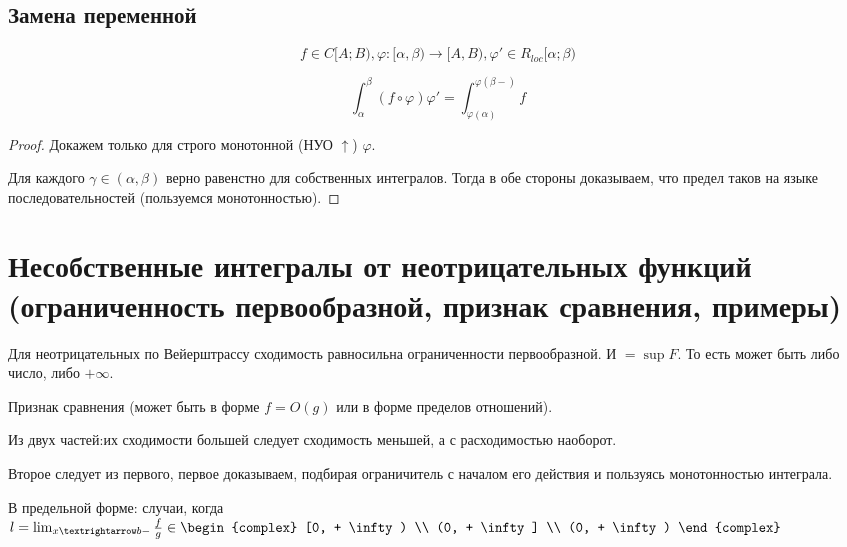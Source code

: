 \documentclass[12pt, a4paper]{article}
\begin{document}
    \subsection{Замена переменной}

    \begin{theorem}

        \begin{equation}
            f \in C[A; B), 
            \varphi: [\alpha, \beta) → [A, B), 
            \varphi' \in R_{loc}[\alpha; \beta)
        \end{equation}

        \begin{equation}
            \int^{\beta}_{\alpha} (f \circ \varphi) \varphi' = \int^{\varphi(\beta-)}_{\varphi(\alpha)} f
        \end{equation}

        \begin{proof}
            Докажем только для строго монотонной (НУО $\uparrow$) $\varphi$.

            Для каждого $\gamma \in (\alpha, \beta)$ верно равенстно для собственных интегралов.
            Тогда в обе стороны доказываем, что предел таков на языке последовательностей (пользуемся монотонностью).
        \end{proof}
    \end{theorem}

\section{Несобственные интегралы от неотрицательных функций (ограниченность первообразной, признак сравнения, примеры)}

    Для неотрицательных по Вейерштрассу сходимость равносильна ограниченности первообразной. И $= \sup F$. То есть может быть либо число, либо $+\infty$.

    Признак сравнения (может быть в форме $f = O(g)$ или в форме пределов отношений).

    Из двух частей:их сходимости большей следует сходимость меньшей, а с расходимостью наоборот.
    
    Второе следует из первого, первое доказываем, подбирая ограничитель с началом его действия и пользуясь монотонностью интеграла.

    В предельной форме: случаи, когда 
    $l = \lim_{x → b-} \frac{f}{g} \in \begin{complex} [0, + \infty) \\ (0, + \infty] \\ (0, + \infty) \end{complex}$
\end{document}
